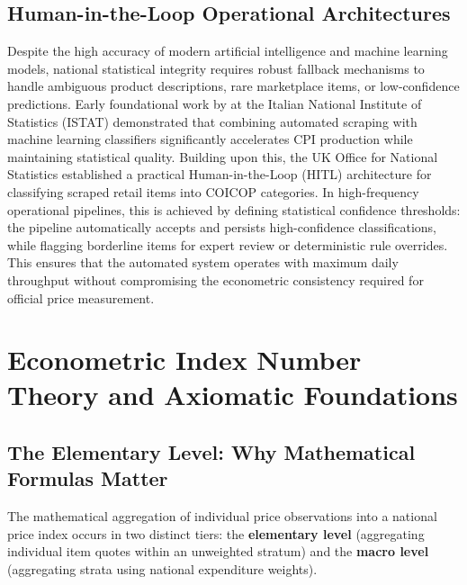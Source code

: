 \subsection{Human-in-the-Loop Operational Architectures}
\hs Despite the high accuracy of modern artificial intelligence and machine learning models, national statistical integrity requires robust fallback mechanisms to handle ambiguous product descriptions, rare marketplace items, or low-confidence predictions. Early foundational work by \cite{polidoro2015webscraping} at the Italian National Institute of Statistics (ISTAT) demonstrated that combining automated scraping with machine learning classifiers significantly accelerates CPI production while maintaining statistical quality. Building upon this, the UK Office for National Statistics \citep{ons2020clothing} established a practical Human-in-the-Loop (HITL) architecture for classifying scraped retail items into COICOP categories. In high-frequency operational pipelines, this is achieved by defining statistical confidence thresholds: the pipeline automatically accepts and persists high-confidence classifications, while flagging borderline items for expert review or deterministic rule overrides. This ensures that the automated system operates with maximum daily throughput without compromising the econometric consistency required for official price measurement.

\section{Econometric Index Number Theory and Axiomatic Foundations}
\subsection{The Elementary Level: Why Mathematical Formulas Matter}
\hs The mathematical aggregation of individual price observations into a national price index occurs in two distinct tiers: the \textbf{elementary level} (aggregating individual item quotes within an unweighted stratum) and the \textbf{macro level} (aggregating strata using national expenditure weights).

